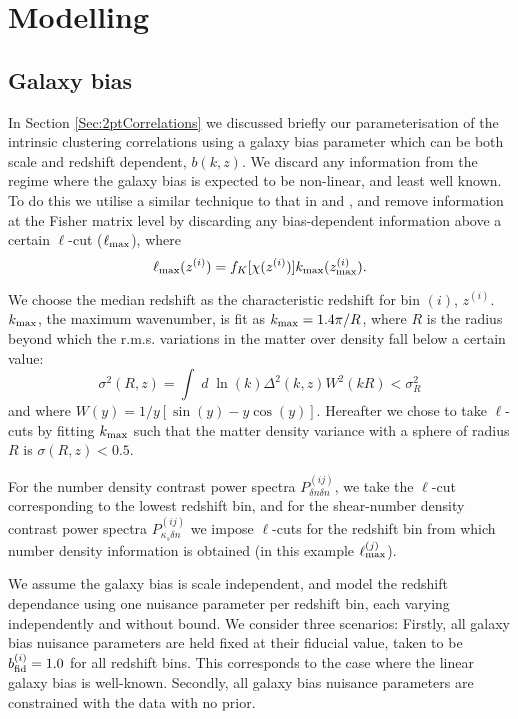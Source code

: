 \documentclass[useAMS,usenatbib,times,letter,amssymb]{mn2e}
\def\be{\begin{equation}}
\def\ee{\end{equation}}
\begin{document}
\section{Modelling}

\subsection{Galaxy bias}\label{Sec:GalaxyBiasModelling}

In Section \ref{Sec:2ptCorrelations} we discussed briefly our parameterisation of the intrinsic clustering correlations using a galaxy bias parameter which can be both scale and redshift dependent, $b(k,z)$. We discard any information from the regime where the galaxy bias is expected to be non-linear, and least well known. To do this we utilise a similar technique to that in \cite{Joachimi:2010p855} and \cite{Rassat:2008p2019}, and remove information at the Fisher matrix level by discarding any bias-dependent information above a certain $\ell$-cut ($\ell_{\rm max}$), where
\be
\ell_{\rm max}(z^{(i)}) = f_K[\chi(z^{(i)})]k_{\rm max}(z^{(i)}_{\rm max}).
\ee

We choose the median redshift as the characteristic redshift for bin $(i)$, $z^{(i)}$. $k_{\rm max}$, the maximum wavenumber, is fit as $k_{\rm max} = 1.4\pi/R$, where $R$ is the radius beyond which the r.m.s. variations in the matter over density fall below a certain value:
\be
\sigma^2(R,z) = \int\;d\;\ln(k) \Delta^2(k,z)W^2(kR) < \sigma_R^2
\ee
and where $W(y) = 1/y[\sin(y) - y\cos(y)]$. Hereafter we chose to take $\ell$-cuts by fitting $k_{\rm max}$ such that the matter density variance with a sphere of radius $R$ is $\sigma(R,z) < 0.5$.  

For the number density contrast power spectra $P^{(ij)}_{\delta n\delta n}$, we take the $\ell$-cut corresponding to the lowest redshift bin, and for the shear-number density contrast power spectra $P^{(ij)}_{\kappa_s \delta n}$ we impose $\ell$-cuts for the redshift bin from which number density information is obtained (in this example $\ell^{(j)}_{\rm max}$).

We assume the galaxy bias is scale independent, and model the redshift dependance using one nuisance parameter per redshift bin, each varying independently and without bound. We consider three scenarios: Firstly, all galaxy bias nuisance parameters are held fixed at their fiducial value, taken to be $b_{\rm fid}^{(i)} = 1.0$ for all redshift bins. This corresponds to the case where the linear galaxy bias is well-known. Secondly, all galaxy bias nuisance parameters are constrained with the data with no prior.
\end{document}
